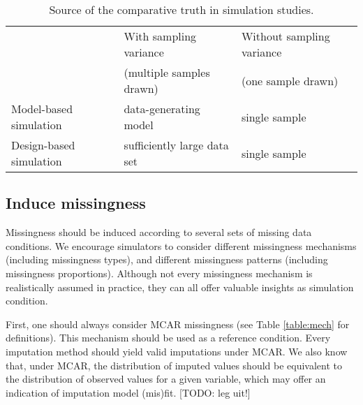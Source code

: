 \documentclass[bimj,fleqn]{w-art}
\begin{document}
\begin{table}[tb]
\begin{center}
\caption{Source of the comparative truth in simulation studies.}
\label{table:dgm_truth}
\begin{tabular}{lll}
\hline
               & With sampling variance      & Without sampling variance \\
               & (multiple samples drawn)    & (one sample drawn) \\
\hline  
Model-based simulation   & data-generating model         & single sample \\
Design-based simulation  & sufficiently large data set   & single sample \\
\hline
\end{tabular}
\end{center}
\end{table}


\subsection{Induce missingness}


Missingness should be induced according to several sets of missing data conditions. We encourage simulators to consider different missingness mechanisms (including missingness types), and different missingness patterns (including missingness proportions). Although not every missingness mechanism is realistically assumed in practice, they can all offer valuable insights as simulation condition. 

First, one should always consider MCAR missingness (see Table \ref{table:mech} for definitions). This mechanism should be used as a reference condition. Every imputation method should yield valid imputations under MCAR. We also know that, under MCAR, the distribution of imputed values should be equivalent to the distribution of observed values for a given variable, which may offer an indication of imputation model (mis)fit. [TODO: leg uit!]
\end{document}
